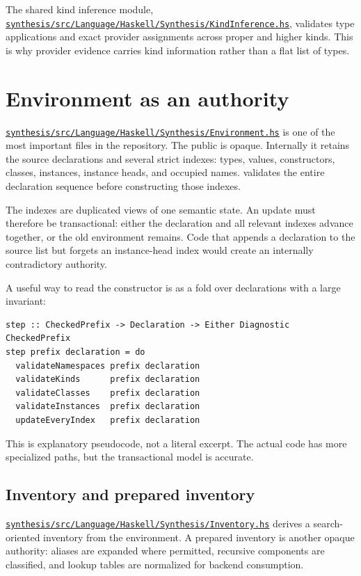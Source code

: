 \documentclass[10pt,letterpaper,oneside]{report}
\newcommand{\code}[1]{\texttt{\detokenize{#1}}}
\def\DjexBase{https://github.com/VladimirReshetnikov/Djex/blob/e454757d53ec057238c22fc6cd0d935b7d96b3dc/}
\newcommand{\dpath}[1]{\href{\DjexBase#1}{\nolinkurl{#1}}}
\begin{document}
The shared kind inference module, \dpath{synthesis/src/Language/Haskell/Synthesis/KindInference.hs}, validates type applications and exact provider assignments across proper and higher kinds. This is why provider evidence carries kind information rather than a flat list of types.

\section{Environment as an authority}\label{sec:djex-environment}

\dpath{synthesis/src/Language/Haskell/Synthesis/Environment.hs} is one of the most important files in the repository. The public \code{Environment} is opaque. Internally it retains the source declarations and several strict indexes: types, values, constructors, classes, instances, instance heads, and occupied names. \code{mkEnvironment} validates the entire declaration sequence before constructing those indexes.

The indexes are duplicated views of one semantic state. An update must therefore be transactional: either the declaration and all relevant indexes advance together, or the old environment remains. Code that appends a declaration to the source list but forgets an instance-head index would create an internally contradictory authority.

A useful way to read the constructor is as a fold over declarations with a large invariant:

\begin{lstlisting}[language=Haskellish]
step :: CheckedPrefix -> Declaration -> Either Diagnostic CheckedPrefix
step prefix declaration = do
  validateNamespaces prefix declaration
  validateKinds      prefix declaration
  validateClasses    prefix declaration
  validateInstances  prefix declaration
  updateEveryIndex   prefix declaration
\end{lstlisting}

This is explanatory pseudocode, not a literal excerpt. The actual code has more specialized paths, but the transactional model is accurate.

\subsection{Inventory and prepared inventory}

\dpath{synthesis/src/Language/Haskell/Synthesis/Inventory.hs} derives a search-oriented inventory from the environment. A prepared inventory is another opaque authority: aliases are expanded where permitted, recursive components are classified, and lookup tables are normalized for backend consumption.
\end{document}
